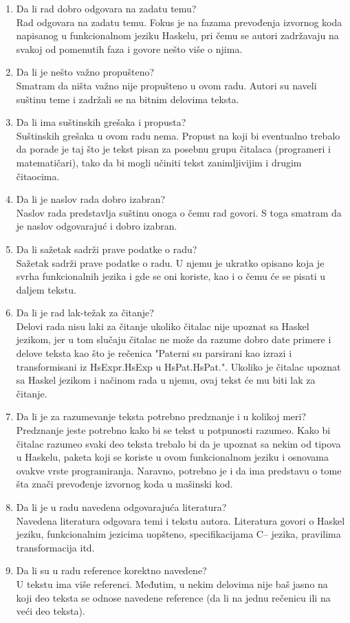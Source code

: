 \documentclass[a4paper]{report}
\begin{document}
	\begin{enumerate}
		\item Da li rad dobro odgovara na zadatu temu?\\
		Rad odgovara na zadatu temu. Fokus je na fazama prevođenja izvornog koda napisanog u funkcionalnom jeziku Haskelu, pri čemu se autori zadržavaju na svakoj od pomenutih faza i govore nešto više o njima.
		\item Da li je nešto važno propušteno?\\
		Smatram da ništa važno nije propušteno u ovom radu. Autori su naveli suštinu teme i zadržali se na bitnim delovima teksta.
		\item Da li ima suštinskih grešaka i propusta?\\
		Suštinskih grešaka u ovom radu nema. Propust na koji bi eventualno trebalo da porade je taj što je tekst pisan za posebnu grupu čitalaca (programeri i matematičari), tako da bi mogli učiniti tekst zanimljivijim i drugim čitaocima.
		\item Da li je naslov rada dobro izabran?\\
		Naslov rada predstavlja suštinu onoga o čemu rad govori. S toga smatram da je naslov odgovarajuć i dobro izabran.
		\item Da li sažetak sadrži prave podatke o radu?\\
		Sažetak sadrži prave podatke o radu. U njemu je ukratko opisano koja je svrha funkcionalnih jezika i gde se oni koriste, kao i o čemu će se pisati u daljem tekstu.
		\item Da li je rad lak-težak za čitanje?\\
		Delovi rada nisu laki za čitanje ukoliko čitalac nije upoznat sa Haskel jezikom, jer u tom slučaju čitalac ne može da razume dobro date primere i delove teksta kao što je rečenica "Paterni su parsirani kao izrazi i transformisani iz HsExpr.HsExp u
		HsPat.HsPat.". Ukoliko je čitalac upoznat sa Haskel jezikom i načinom rada u njemu, ovaj tekst će mu biti lak za čitanje.
		\item Da li je za razumevanje teksta potrebno predznanje i u kolikoj meri?\\
		Predznanje jeste potrebno kako bi se tekst u potpunosti razumeo. Kako bi čitalac razumeo svaki deo teksta trebalo bi da je upoznat sa nekim od tipova u Haskelu, paketa koji se koriste u ovom funkcionalnom jeziku i osnovama ovakve vrste programiranja. Naravno, potrebno je i da ima predstavu o tome šta znači prevođenje izvornog koda u mašinski kod.
		\item Da li je u radu navedena odgovarajuća literatura?\\
		Navedena literatura odgovara temi i tekstu autora. Literatura govori o Haskel jeziku, funkcionalnim jezicima uopšteno, specifikacijama C-- jezika, pravilima transformacija itd. 
		\item Da li su u radu reference korektno navedene?\\
		U tekstu ima više referenci. Međutim, u nekim delovima nije baš jasno na koji deo teksta se odnose navedene reference (da li na jednu rečenicu ili na veći deo teksta).
		

\end{enumerate}
\end{document}

